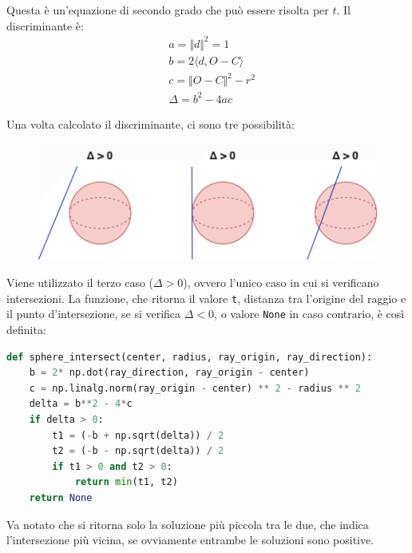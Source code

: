 \documentclass[9pt,a4paper,twoside]{tau}
\begin{document}
Questa è un'equazione di secondo grado che può essere risolta per $t$. Il discriminante è:
\begin{equation*}
	\begin{split}
		& a = \Vert d \Vert ^2 = 1\\
		& b = 2 \langle d, O-C \rangle\\
		& c = \Vert O-C \Vert ^2 - r^2 \\
		& \Delta = b^2 - 4ac
	\end{split}
\end{equation*}

Una volta calcolato il discriminante, ci sono tre possibilità:

\begin{figure}[H]
    \centering
    \includegraphics[width=0.7\columnwidth]{Figures/17.png}
    \caption{}
    \label{fig:figure}
\end{figure}
Viene utilizzato il terzo caso ($\Delta > 0$), ovvero l'unico caso in cui si verificano intersezioni. La funzione, che ritorna il valore \texttt{t}, distanza tra l'origine del raggio e il punto d'intersezione, se si verifica $\Delta<0$, o valore \texttt{None} in caso contrario, è così definita:
\begin{lstlisting}[language=Python]
def sphere_intersect(center, radius, ray_origin, ray_direction):
    b = 2* np.dot(ray_direction, ray_origin - center)
    c = np.linalg.norm(ray_origin - center) ** 2 - radius ** 2
    delta = b**2 - 4*c
    if delta > 0:
        t1 = (-b + np.sqrt(delta)) / 2
        t2 = (-b - np.sqrt(delta)) / 2
        if t1 > 0 and t2 > 0:
            return min(t1, t2)
    return None
\end{lstlisting}
Va notato che si ritorna solo la soluzione più piccola tra le due, che indica l'intersezione più vicina, se ovviamente entrambe le soluzioni sono positive.
\end{document}
